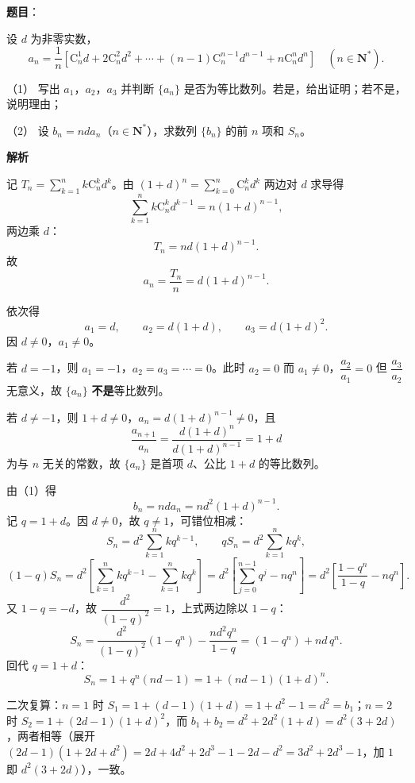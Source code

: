 \begin{answer}

\textbf{题目}：

设 $d$ 为非零实数，
\nopagebreak[4]
\[a_n=\frac1n\left[\mathrm C_n^1d+2\mathrm C_n^2d^2+\cdots+(n-1)\mathrm C_n^{n-1}d^{n-1}+n\mathrm C_n^nd^n\right]\quad(n\in\mathbf N^*).\]

（1） 写出 $a_1$，$a_2$，$a_3$ 并判断 $\{a_n\}$ 是否为等比数列。若是，给出证明；若不是，说明理由；

（2） 设 $b_n=nda_n$（$n\in\mathbf N^*$），求数列 $\{b_n\}$ 的前 $n$ 项和 $S_n$。

\textbf{解析}

记 $T_n=\displaystyle\sum_{k=1}^{n}k\mathrm C_n^kd^k$。由 $(1+d)^n=\sum\limits_{k=0}^{n}\mathrm C_n^kd^k$ 两边对 $d$ 求导得
\nopagebreak[4]
\[\sum_{k=1}^{n}k\mathrm C_n^kd^{k-1}=n(1+d)^{n-1},\]
两边乘 $d$：
\nopagebreak[4]
\[T_n=nd(1+d)^{n-1}.\]
故
\nopagebreak[4]
\[a_n=\frac{T_n}{n}=d(1+d)^{n-1}.\]

依次得
\nopagebreak[4]
\[a_1=d,\qquad a_2=d(1+d),\qquad a_3=d(1+d)^2.\]
因 $d\neq0$，$a_1\neq0$。

若 $d=-1$，则 $a_1=-1$，$a_2=a_3=\cdots=0$。此时 $a_2=0$ 而 $a_1\neq0$，$\dfrac{a_2}{a_1}=0$ 但 $\dfrac{a_3}{a_2}$ 无意义，故 $\{a_n\}$ \textbf{不是}等比数列。

若 $d\neq-1$，则 $1+d\neq0$，$a_n=d(1+d)^{n-1}\neq0$，且
\nopagebreak[4]
\[\frac{a_{n+1}}{a_n}=\frac{d(1+d)^{n}}{d(1+d)^{n-1}}=1+d\]
为与 $n$ 无关的常数，故 $\{a_n\}$ 是首项 $d$、公比 $1+d$ 的等比数列。

由（1）得
\nopagebreak[4]
\[b_n=nda_n=nd^2(1+d)^{n-1}.\]
记 $q=1+d$。因 $d\neq0$，故 $q\neq1$，可错位相减：
\nopagebreak[4]
\[S_n=d^2\sum_{k=1}^{n}kq^{k-1},\qquad qS_n=d^2\sum_{k=1}^{n}kq^{k},\]
\nopagebreak[4]
\[(1-q)S_n=d^2\left[\sum_{k=1}^{n}kq^{k-1}-\sum_{k=1}^{n}kq^{k}\right]=d^2\left[\sum_{j=0}^{n-1}q^{j}-nq^{n}\right]=d^2\left[\frac{1-q^{n}}{1-q}-nq^{n}\right].\]
又 $1-q=-d$，故 $\dfrac{d^2}{(1-q)^2}=1$，上式两边除以 $1-q$：
\nopagebreak[4]
\[S_n=\frac{d^2}{(1-q)^2}(1-q^{n})-\frac{nd^2q^{n}}{1-q}=(1-q^{n})+nd\,q^{n}.\]
回代 $q=1+d$：
\nopagebreak[4]
\[S_n=1+q^n(nd-1)=1+(nd-1)(1+d)^n.\]

二次复算：$n=1$ 时 $S_1=1+(d-1)(1+d)=1+d^2-1=d^2=b_1$；$n=2$ 时 $S_2=1+(2d-1)(1+d)^2$，而 $b_1+b_2=d^2+2d^2(1+d)=d^2(3+2d)$，两者相等（展开 $(2d-1)(1+2d+d^2)=2d+4d^2+2d^3-1-2d-d^2=3d^2+2d^3-1$，加 $1$ 即 $d^2(3+2d)$），一致。



\end{answer}

